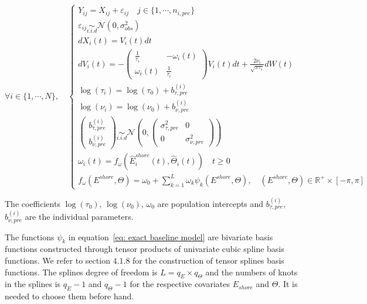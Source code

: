 \documentclass[11pt]{article}
\newcommand {\R}{\mathbb{R}}
\newcommand {\1}{\mathbb{1}}
\begin{document}
\begin{equation}  \forall i \in \{1,\cdots,N\}, \quad \left\{
	\begin{array}{l}
		Y_{ij}=X_{ij}+\varepsilon_{ij} \quad j \in \{1,\cdots,n_{i,pre}\}\\
		\varepsilon_{ij} \underset{i.i.d}{\sim} \mathcal{N}(0,\sigma_{obs}^2)  \\
		dX_i(t)=V_i(t)dt  \\
		dV_i(t)=-\begin{pmatrix} 
			\frac{1}{\tau_i} & -\omega_i(t) \\
			\omega_i(t) & \frac{1}{\tau_i}
		\end{pmatrix}V_i(t)dt+\frac{2\nu_i}{\sqrt{\pi \tau_i}} dW(t) \\
		\log(\tau_i)=\log(\tau_0)+b_{\tau,pre}^{(i)} \\
		\log(\nu_i)=\log(\nu_0)+b_{\nu,pre}^{(i)}  \\
		\begin{pmatrix} b_{\tau,pre}^{(i)} \\ b_{\nu,pre}^{(i)} \end{pmatrix} \underset{i.i.d}{\sim} \mathcal{N}\left(0,\begin{pmatrix} \sigma_{\tau,pre}^2 & 0 \\ 0 & \sigma_{\nu,pre}^2 \end{pmatrix}\right) \\
		\omega_i(t)=f_{\omega}(\hat{E}^{shore}_i(t),\hat{\Theta}_i(t)) \quad t \geq 0\\
		f_{\omega}(E^{shore},\Theta)=\omega_{0}+\sum_{k=1}^{L} \omega_{k} \psi_k(E^{shore},\Theta), \quad (E^{shore},\Theta) \in \R^+ \times [-\pi,\pi]
	\end{array}
	\right.
	\label{eq: exact baseline model}
\end{equation}



The coefficients $\log(\tau_{0})$, $\log(\nu_{0})$, $\omega_{0}$ are population intercepts and $b^{(i)}_{\tau,pre}$, $b^{(i)}_{\nu,pre}$
are the individual parameters. 

The functions $\psi_k$ in equation~\ref{eq: exact baseline model} are bivariate basis functions constructed through tensor products of univariate cubic spline basis functions. We refer to \cite{wood_generalized_2017} section $4.
1.8$ for the construction of tensor splines basis functions. The splines degree of freedom is $L=q_E \times q_{\Theta}$ and the numbers of knots in the splines is $q_E-1$ and $q_{\Theta}-1$ for the respective covariates $E_{shore}$ and $\Theta$. It is needed to choose them before hand.\\
\end{document}
